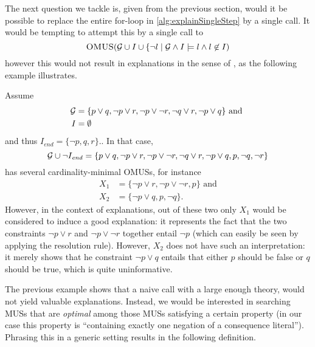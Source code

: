 The next question we tackle is, given \fall from the previous section, would it be possible to replace the entire for-loop in \cref{alg:explainSingleStep} by a single \omus call.
It would be tempting to attempt this by a single call to 
\[\textsc{OMUS}(\mathcal{G} \cup I\cup\{\lnot l\mid \mathcal{G}  \land I\models l\land l\not\in I)\]
however this would not result in explanations in the sense of \citet{ecai/BogaertsGCG20}, as the following example illustrates. 
\begin{example}
Assume \begin{align*}
         \mathcal{G}  &= \{p\lor q, \lnot p \lor r, \lnot p \lor \lnot r, \lnot q\lor r, \lnot p \lor q \}\text{ and }\\
         I &= \emptyset
       \end{align*}
       and thus
$         I_{\mathit{end}} = \{ \lnot p, q, r\}.
$. 
In that case, 
\[\mathcal{G} \cup \lnot I_{\mathit{end}} = \{p\lor q, \lnot p \lor r, \lnot p \lor \lnot r, \lnot q\lor r, \lnot p \lor q , p,\lnot q,\lnot r \}\]
has several cardinality-minimal OMUSs, for instance 
\begin{align*}
X_1 &=    \{\lnot p \lor r, \lnot p \lor \lnot r, p\}\text{ and}\\
X_2 &= \{\lnot p \lor q ,  p, \lnot q\}.
\end{align*}
However, in the context of explanations, out of these two only $X_1$ would be considered to induce a good explanation: it represents the fact that the two constraints $\lnot p \lor r$ and $ \lnot p \lor \lnot r$ together entail $\lnot p$ (which can easily be seen by applying the resolution rule). However, $X_2$ does not have such an interpretation: it merely shows that he constraint $\lnot p \lor q$ entails that either $p$ should be false or $q$ should be true, which is quite uninformative. 
\end{example}

The previous example shows that a naive \omus call with a large enough theory, would not yield valuable explanations.
Instead, we would be interested in searching MUSs that are \emph{optimal} among those MUSs satisfying a certain property (in our case this property is ``containing exactly one negation of a consequence literal''). 
Phrasing this in a generic setting results in the following definition.

